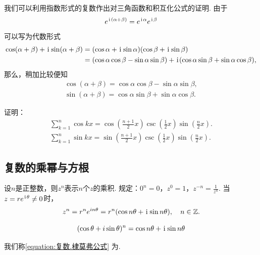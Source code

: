 我们可以利用指数形式的复数作出对三角函数和积互化公式的证明.
由于\begin{equation*}
e^{\kern1pt\mathrm{i}\kern1pt(\alpha+\beta)}
= e^{\kern1pt\mathrm{i}\kern1pt \alpha} e^{\kern1pt\mathrm{i}\kern1pt \beta}
\end{equation*}
可以写为代数形式
\begin{equation*}\begin{aligned}
\cos(\alpha+\beta)+ \kern1pt\mathrm{i}\kern1pt \sin(\alpha+\beta)
&= (\cos\alpha+ \kern1pt\mathrm{i}\kern1pt \sin\alpha)(\cos\beta+ \kern1pt\mathrm{i}\kern1pt \sin\beta) \\
&= (\cos\alpha \cos\beta - \sin\alpha \sin\beta)
    + \kern1pt\mathrm{i}\kern1pt(\cos\alpha \sin\beta + \sin\alpha \cos\beta),
\end{aligned}\end{equation*}
那么，稍加比较便知\begin{gather*}
	\cos(\alpha+\beta)
	= \cos\alpha \cos\beta
	- \sin\alpha \sin\beta, \\
	\sin(\alpha+\beta)
	= \cos\alpha \sin\beta
	+ \sin\alpha \cos\beta.
\end{gather*}

\begin{example}
证明：\begin{gather}
\sum_{k=1}^n \cos kx
    = \cos(\frac{n+1}{2}x)
    \csc(\frac{1}{2}x)
    \sin(\frac{n}{2}x). \\
\sum_{k=1}^n \sin kx
    = \sin(\frac{n+1}{2}x)
    \csc(\frac{1}{2}x)
    \sin(\frac{n}{2}x).
\end{gather}
\end{example}

\subsection{复数的乘幂与方根}
\begin{definition}
设\(n\)是正整数，则\(z^n\)表示\(n\)个\(z\)的乘积.
规定：\(0^n=0\)，\(z^0=1\)，\(z^{-n}=\frac{1}{z^n}\).
当\(z=re^{\kern1pt\mathrm{i}\kern1pt \theta} \neq 0\)时，\begin{equation*}
z^n = r^n e^{in\theta} = r^n(\cos n\theta+ \kern1pt\mathrm{i}\kern1pt \sin n\theta),
\quad n \in \mathbb{Z}.
\end{equation*}
\end{definition}

\begin{theorem}%
\begin{equation}\label{equation:复数.棣莫弗公式}
	(\cos\theta+i\sin\theta)^n = \cos{n\theta}+ \kern1pt\mathrm{i}\kern1pt \sin{n\theta}
\end{equation}
\end{theorem}
我们称\cref{equation:复数.棣莫弗公式} 为.

